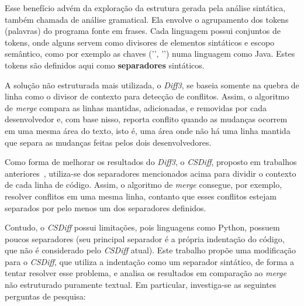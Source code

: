 Esse benefício advém da exploração da estrutura gerada pela análise sintática,
também chamada de análise gramatical. Ela envolve o agrupamento dos tokens
(palavras) do programa fonte em frases. Cada linguagem possui conjuntos de
tokens, onde alguns servem como divisores de elementos sintáticos e escopo
semântico, como por exemplo as chaves ('{', '}') numa linguagem como Java.
Estes tokens são definidos aqui como
\textbf{separadores} sintáticos.

A solução não estruturada mais utilizada, o \emph{Diff3}, se baseia somente na
quebra de linha como o divisor de contexto para detecção de conflitos. Assim, o
algoritmo de \emph{merge} compara as linhas mantidas, adicionadas, e removidas
por cada desenvolvedor e, com base nisso, reporta conflito quando as mudanças
ocorrem em uma mesma área do texto, isto é, uma área onde  não há uma linha
mantida que separa as mudanças feitas pelos dois desenvolvedores.

Como forma de melhorar os resultados do \emph{Diff3}, o \emph{CSDiff}, proposto
em trabalhos anteriores~\cite{clem21}, utiliza-se dos separadores mencionados
acima para dividir o contexto de cada linha de código. Assim, o algoritmo de
\emph{merge} consegue, por exemplo, resolver conflitos em uma mesma linha,
contanto que esses conflitos estejam separados por pelo menos um dos
separadores definidos.

Contudo, o \emph{CSDiff} possui limitações, pois linguagens como Python,
possuem poucos separadores (seu principal separador é a própria indentação do
código, que não é considerado pelo \emph{CSDiff} atual). Este trabalho propõe
uma modificação para o \emph{CSDiff}, que utiliza a indentação como um
separador sintático, de forma a tentar resolver esse problema, e analisa os
resultados em comparação ao \emph{merge} não estruturado puramente textual. Em
particular, investiga-se as seguintes perguntas de pesquisa:

